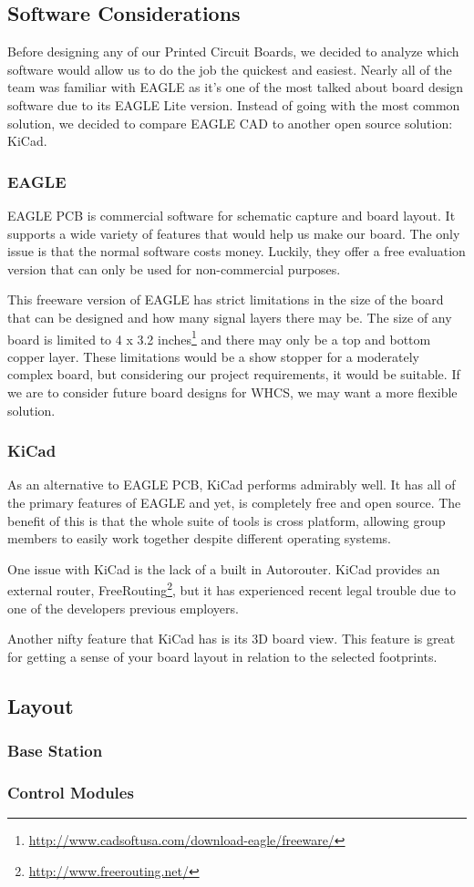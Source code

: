 
\subsection{Software Considerations}
Before designing any of our Printed Circuit Boards, we decided to analyze which
software would allow us to do the job the quickest and easiest. Nearly all of
the team was familiar with EAGLE as it's one of the most talked about board
design software due to its EAGLE Lite version. Instead of going with the most
common solution, we decided to compare EAGLE CAD to another open source
solution: KiCad.

\subsubsection{EAGLE}
EAGLE PCB is commercial software for schematic capture and board layout. It
supports a wide variety of features that would help us make our board. The only
issue is that the normal software costs money. Luckily, they offer a free
evaluation version that can only be used for non-commercial purposes.

This freeware version of EAGLE has strict limitations in the size of the board
that can be designed and how many signal layers there may be. The size of any
board is limited to 4 x 3.2
inches\footnote{\url{http://www.cadsoftusa.com/download-eagle/freeware/}} and
there may only be a top and bottom copper layer. These limitations would be a
show stopper for a moderately complex board, but considering our project
requirements, it would be suitable.  If we are to consider future board designs
for WHCS, we may want a more flexible solution.

\subsubsection{KiCad}
As an alternative to EAGLE PCB, KiCad performs admirably well. It has all of
the primary features of EAGLE and yet, is completely free and open source. The benefit of this is that the whole suite of tools is cross platform, allowing group members to easily work together despite different operating systems.

One issue with KiCad is the lack of a built in Autorouter. KiCad provides an external router, FreeRouting\footnote{\url{http://www.freerouting.net/}}, but it has experienced recent legal trouble due to one of the developers previous employers.

Another nifty feature that KiCad has is its 3D board view. This feature is great for getting a sense of your board layout in relation to the selected footprints.

\subsection{Layout}

\subsubsection{Base Station}

\subsubsection{Control Modules}

